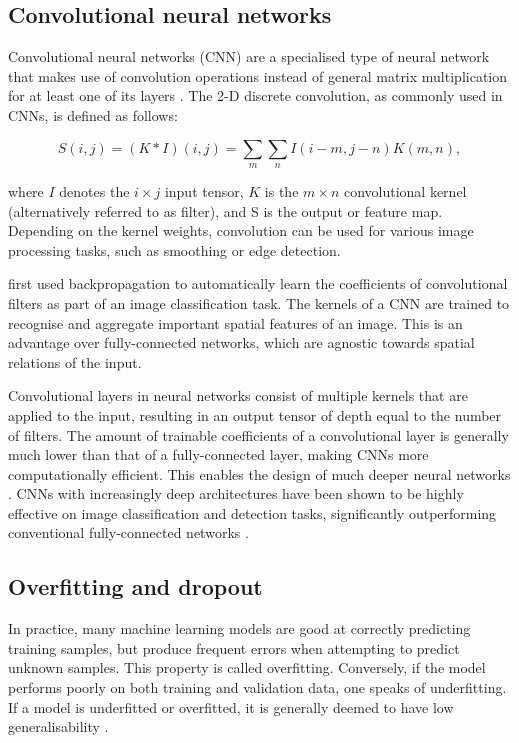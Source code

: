 \documentclass{l4proj}
\begin{document}
\subsection{Convolutional neural networks}

Convolutional neural networks (CNN) are a specialised type of neural network that makes use of convolution operations instead of general matrix multiplication for at least one of its layers \citep{goodfellow_deep_2016}. The 2-D discrete convolution, as commonly used in CNNs, is defined as follows:

\begin{equation}
  S(i, j) = (K \ast I) (i, j) = \sum_m \sum_n I(i-m, j-n) K(m, n),
\end{equation}

where $I$ denotes the $i \times j$ input tensor, $K$ is the $m \times n$ convolutional kernel (alternatively referred to as filter), and S is the output or feature map. Depending on the kernel weights, convolution can be used for various image processing tasks, such as smoothing or edge detection.

\citet{lecun_backpropagation_1989} first used backpropagation to automatically learn the coefficients of convolutional filters as part of an image classification task. The kernels of a CNN are trained to recognise and aggregate important spatial features of an image. This is an advantage over fully-connected networks, which are agnostic towards spatial relations of the input.

Convolutional layers in neural networks consist of multiple kernels that are applied to the input, resulting in an output tensor of depth equal to the number of filters. The amount of trainable coefficients of a convolutional layer is generally much lower than that of a fully-connected layer, making CNNs more computationally efficient. This enables the design of much deeper neural networks \citep{goodfellow_deep_2016}. CNNs with increasingly deep architectures have been shown to be highly effective on image classification and detection tasks, significantly outperforming conventional fully-connected networks \citep{krizhevsky_imagenet_2012, szegedy_going_2015, he_deep_2016}.


\subsection{Overfitting and dropout}

In practice, many machine learning models are good at correctly predicting training samples, but produce frequent errors when attempting to predict unknown samples. This property is called overfitting. Conversely, if the model performs poorly on both training and validation data, one speaks of underfitting. If a model is underfitted or overfitted, it is generally deemed to have low generalisability \citep{burkov_hundred-page_2019}. 
\end{document}
